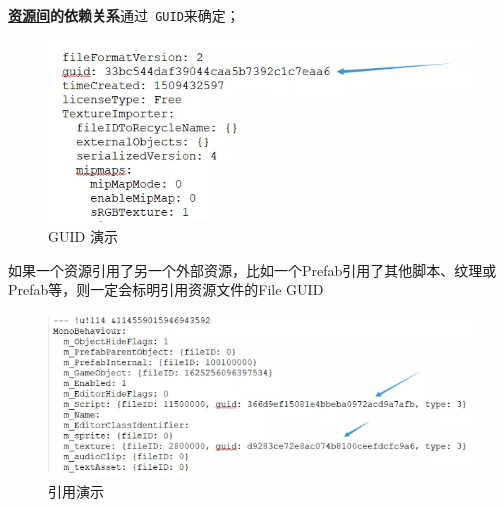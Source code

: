 \documentclass[UTF8,a4paper,12pt]{ctexbook}
\begin{document}
			\textbf{\underline{资源间}的依赖关系}通过\verb| GUID|来确定；
					\begin{figure}[H]
						\centering
						\includegraphics[scale=1]{guid}
						\caption{GUID 演示}
					\end{figure}
			如果一个资源引用了另一个外部资源，比如一个Prefab引用了其他脚本、纹理或Prefab等，则一定会标明引用资源文件的File GUID
					\begin{figure}[H]
						\centering
						\includegraphics[scale=0.9]{guidRef}
						\caption{引用演示}
					\end{figure}
				
\end{document}
